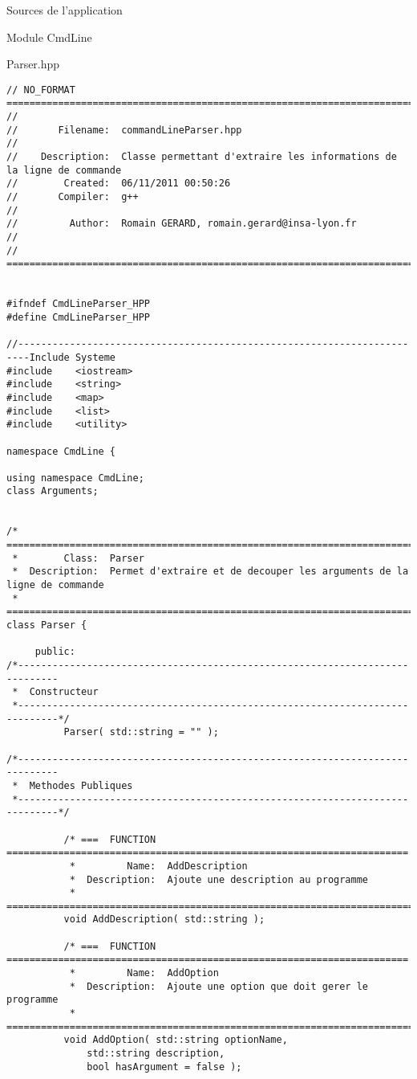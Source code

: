 \documentclass{article}
\begin{document}
\begin{section}{Sources de l'application}

  \begin{subsection}{Module CmdLine}
  \begin{paragraph}{Parser.hpp}
      \begin{verbatim}
// NO_FORMAT ===========================================================================
//
//       Filename:  commandLineParser.hpp
//
//    Description:  Classe permettant d'extraire les informations de la ligne de commande
//        Created:  06/11/2011 00:50:26
//       Compiler:  g++
//
//         Author:  Romain GERARD, romain.gerard@insa-lyon.fr
//
// =====================================================================================


#ifndef CmdLineParser_HPP
#define CmdLineParser_HPP

//------------------------------------------------------------------------Include Systeme
#include    <iostream>
#include    <string>
#include    <map>
#include    <list>
#include    <utility>

namespace CmdLine {

using namespace CmdLine;
class Arguments;


/* =====================================================================================
 *        Class:  Parser
 *  Description:  Permet d'extraire et de decouper les arguments de la ligne de commande
 * =====================================================================================*/
class Parser {

     public:
/*-----------------------------------------------------------------------------
 *  Constructeur
 *-----------------------------------------------------------------------------*/
          Parser( std::string = "" );

/*-----------------------------------------------------------------------------
 *  Methodes Publiques
 *-----------------------------------------------------------------------------*/

          /* ===  FUNCTION  ======================================================================
           *         Name:  AddDescription
           *  Description:  Ajoute une description au programme
           * =====================================================================================*/
          void AddDescription( std::string );

          /* ===  FUNCTION  ======================================================================
           *         Name:  AddOption
           *  Description:  Ajoute une option que doit gerer le programme
           * =====================================================================================*/
          void AddOption( std::string optionName, 
			  std::string description, 
			  bool hasArgument = false );
          

\end{verbatim}
\end{paragraph}
\end{subsection}
\end{section}
\end{document}
